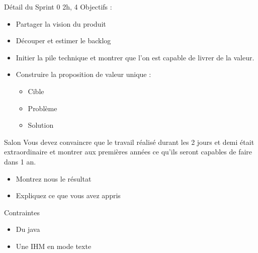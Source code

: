 \documentclass{beamer}
\begin{document}
\begin{frame}{Détail du Sprint 0}
  2h, 4 Objectifs : 
  \begin{itemize}
    \item Partager la vision du produit
    \item Découper et estimer le backlog
    \item Initier la pile technique et montrer que l'on est capable de livrer de la valeur.
    \item Construire la proposition de valeur unique :
    \begin{itemize}
      \item Cible
      \item Problème
      \item Solution
    \end{itemize}
  \end{itemize}
\end{frame}

\begin{frame}{Salon}
  Vous devez convaincre que le travail réalisé durant les 2 jours et demi était extraordinaire et montrer aux premières années ce qu'ils seront capables de faire dans 1 an.
  \begin{itemize}
    \item Montrez nous le résultat
    \item Expliquez ce que vous avez appris
  \end{itemize}
\end{frame}

\begin{frame}{Contraintes}
  \begin{itemize}
    \item Du java
    \item Une IHM en mode texte
  \end{itemize}
\end{frame}
\end{document}
